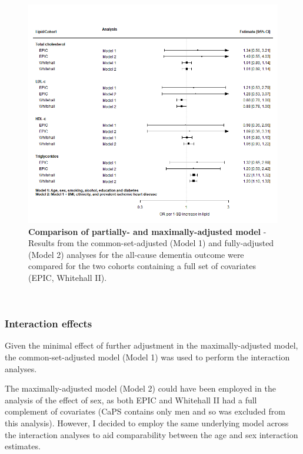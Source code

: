\documentclass[a4paper, twoside]{templates/ociamthesis}
\begin{document}
\begin{figure}[H]
\includegraphics[width=1\linewidth]{figures/ipd/main_model_comparison} \caption[Comparison of partially and maximally adjusted results]{\textbf{Comparison of partially- and maximally-adjusted model} - Results from the common-set-adjusted (Model 1) and fully-adjusted (Model 2) analyses for the all-cause dementia outcome were compared for the two cohorts containing a full set of covariates (EPIC, Whitehall II).}\label{fig:ipdModelComparison}
\end{figure}

~

\hypertarget{interaction-effects}{%
\subsubsection{Interaction effects}\label{interaction-effects}}

Given the minimal effect of further adjustment in the maximally-adjusted model, the common-set-adjusted model (Model 1) was used to perform the interaction analyses.

The maximally-adjusted model (Model 2) could have been employed in the analysis of the effect of sex, as both EPIC and Whitehall II had a full complement of covariates (CaPS contains only men and so was excluded from this analysis). However, I decided to employ the same underlying model across the interaction analyses to aid comparability between the age and sex interaction estimates.
\end{document}
